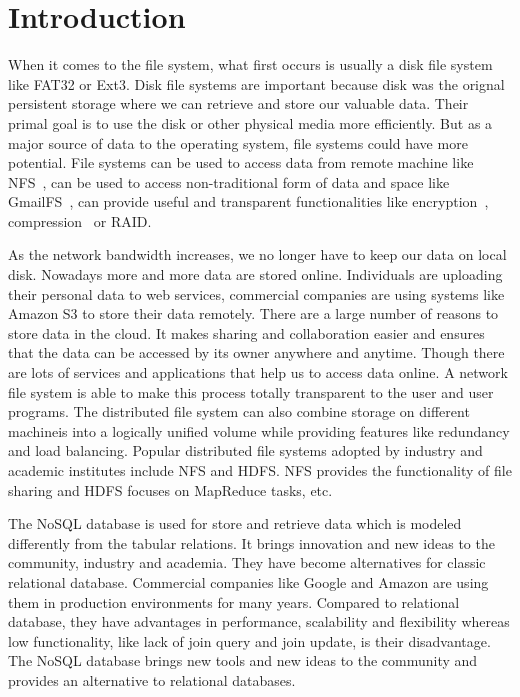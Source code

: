 \chapter{Introduction}
\label{chap:intro}

    When it comes to the file system, what first occurs is usually a disk file system like FAT32 or Ext3. Disk file systems are important because disk was the orignal persistent storage where we can retrieve and store our valuable data. Their primal goal is to use the disk or other physical media more efficiently. But as a major source of data to the operating system, file systems could have more potential. File systems can be used to access data from remote machine like NFS~\cite{nfs}, can be used to access non-traditional form of data and space like GmailFS~\cite{gmailfs, gmailfs2}, can provide useful and transparent functionalities like encryption~\cite{encrypt}, compression~\cite{compression} or RAID.

    As the network bandwidth increases, we no longer have to keep our data on local disk. Nowadays more and more data are stored online. Individuals are uploading their personal data to web services, commercial companies are using systems like Amazon S3 to store their data remotely. There are a large number of reasons to store data in the cloud. It makes sharing and collaboration easier and ensures that the data can be accessed by its owner anywhere and anytime. Though there are lots of services and applications that help us to access data online. A network file system is able to make this process totally transparent to the user and user programs. The distributed file system can also combine storage on different machineis into a logically unified volume while providing features like redundancy and load balancing. Popular distributed file systems adopted by industry and academic institutes include NFS and HDFS. NFS provides the functionality of file sharing and HDFS focuses on MapReduce tasks, etc.

    The NoSQL database is used for store and retrieve data which is modeled differently from the tabular relations. It brings innovation and new ideas to the community, industry and academia. They have become alternatives for classic relational database. Commercial companies like Google and Amazon are using them in production environments for many years. Compared to relational database, they have advantages in performance, scalability and flexibility whereas low functionality, like lack of join query and join update, is their disadvantage. The NoSQL database brings new tools and new ideas to the community and provides an alternative to relational databases. 

